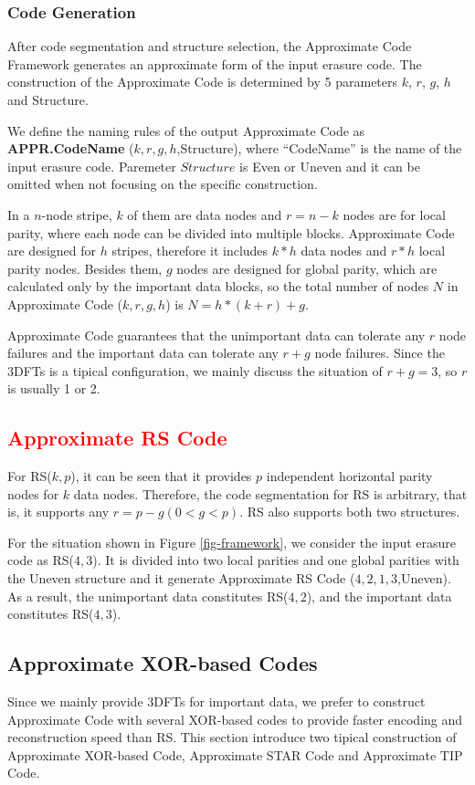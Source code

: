 \documentclass[sigconf]{acmart}
\begin{document}
\subsubsection{Code Generation}\label{code-gen}
After code segmentation and structure selection, the Approximate Code Framework generates an approximate form of the input erasure code.
The construction of the Approximate Code is determined by 5 parameters $k$, $r$, $g$, $h$ and Structure. 

We define the naming rules of the output Approximate Code as \textbf{APPR.CodeName} ($k,r,g,h$,Structure), where ``CodeName'' is the name of the input erasure code. Paremeter $Structure$ is Even or Uneven and it can be omitted when not focusing on the specific construction.

In a $n$-node stripe, $k$ of them are data nodes and $r=n-k$ nodes are for local parity, where each node can be divided into multiple blocks.
Approximate Code are designed for $h$ stripes, therefore it includes $k*h$ data nodes and $r*h$ local parity nodes.
Besides them, $g$ nodes are designed for global parity, which are calculated only by the important data blocks, so the total number of nodes $N$ in Approximate Code ($k,r,g,h$) is 
$N= h*(k+r) + g$.

Approximate Code guarantees that the unimportant data can tolerate any $r$ node failures and the important data can tolerate any $r+g$ node failures.
Since the 3DFTs is a tipical configuration, we mainly discuss the situation of $r+g=3$, so $r$ is usually 1 or 2.

\subsection{\textcolor{red}{Approximate RS Code}}
For RS($k,p$), it can be seen that it provides $p$ independent horizontal parity nodes for $k$ data nodes. Therefore, the code segmentation for RS is arbitrary, that is, it supports any $r=p-g(0<g<p)$. RS also supports both two structures. 

For the situation shown in Figure \ref{fig-framework}, we consider the input erasure code as RS($4,3$). It is divided into two local parities and one global parities with the Uneven structure and it generate Approximate RS Code ($4,2,1,3$,Uneven).
As a result, the unimportant data constitutes RS($4,2$), and the important data constitutes RS($4,3$).


\subsection{Approximate XOR-based Codes}
Since we mainly provide 3DFTs for important data, we prefer to construct Approximate Code with several XOR-based codes to provide faster encoding and reconstruction speed than RS. This section introduce two tipical construction of Approximate XOR-based Code, Approximate STAR Code and Approximate TIP Code.
\end{document}
